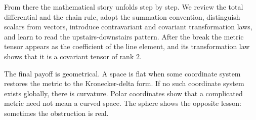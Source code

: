 From there the mathematical story unfolds step by step. We review the total differential and the chain rule, adopt the summation convention, distinguish scalars from vectors, introduce contravariant and covariant transformation laws, and learn to read the upstairs-downstairs pattern. After the break the metric tensor appears as the coefficient of the line element, and its transformation law shows that it is a covariant tensor of rank \(2\).

The final payoff is geometrical. A space is flat when some coordinate system restores the metric to the Kronecker-delta form. If no such coordinate system exists globally, there is curvature. Polar coordinates show that a complicated metric need not mean a curved space. The sphere shows the opposite lesson: sometimes the obstruction is real.
